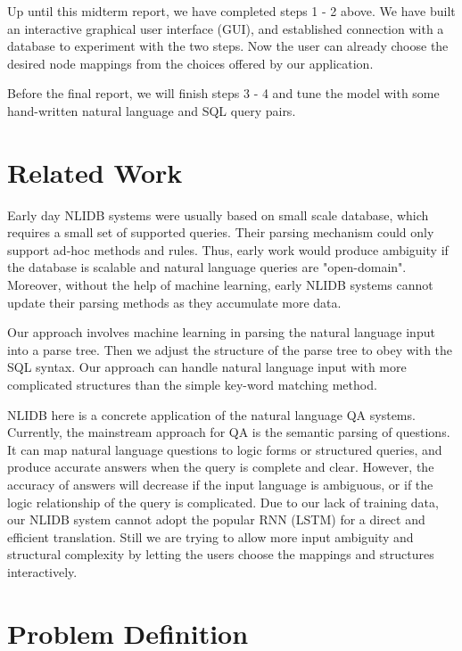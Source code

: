 \documentclass[twocolumn]{article}
\begin{document}
Up until this midterm report, we have completed steps 1 - 2 above. We have built an interactive graphical user interface (GUI), and established connection with a database to experiment with the two steps. Now the user can already choose the desired node mappings from the choices offered by our application. 

Before the final report, we will finish steps 3 - 4 and tune the model with some hand-written natural language and SQL query pairs. 

\section{Related Work}

Early day NLIDB systems were usually based on small scale database, which requires a small set of supported queries. Their parsing mechanism could only support ad-hoc methods and rules. Thus, early work would produce ambiguity if the database is scalable and natural language queries are "open-domain". Moreover, without the help of machine learning, early NLIDB systems cannot update their parsing methods as they accumulate more data.\cite{QATutorial}

Our approach involves machine learning in parsing the natural language input into a parse tree. Then we adjust the structure of the parse tree to obey with the SQL syntax. Our approach can handle natural language input with more complicated structures than the simple key-word matching method. 

NLIDB here is a concrete application of the natural language QA systems.\cite{QATutorial} Currently, the mainstream approach for QA is the semantic parsing of questions. It can map natural language questions to logic forms or structured queries, and produce accurate answers when the query is complete and clear. However, the accuracy of answers will decrease if the input language is ambiguous, or if the logic relationship of the query is complicated. Due to our lack of training data, our NLIDB system cannot adopt the popular RNN (LSTM) for a direct and efficient translation. Still we are trying to allow more input ambiguity and structural complexity by letting the users choose the mappings and structures interactively.

\section{Problem Definition}
\end{document}
